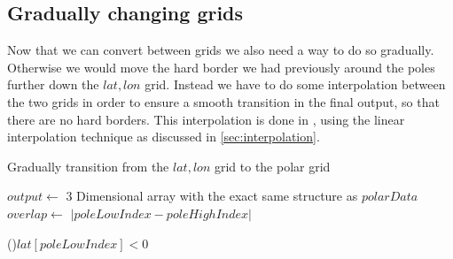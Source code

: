 \subsection{Gradually changing grids}
Now that we can convert between grids we also need a way to do so gradually. Otherwise we would move the hard border we had previously around the poles further down the $lat, lon$ grid. Instead 
we have to do some interpolation between the two grids in order to ensure a smooth transition in the final output, so that there are no hard borders. This interpolation is done in , using the 
linear interpolation technique as discussed in \autoref{sec:interpolation}.

\begin{algorithm}[htb]
    \caption{Gradually transition from the $lat, lon$ grid to the polar grid}
    \label{alg:polar interpolation}
    $output \leftarrow$ 3 Dimensional array with the exact same structure as $polarData$ \;
    $overlap \leftarrow $ $|poleLowIndex - poleHighIndex|$ \;
    
    \BlankLine
    \uIf(){$lat[poleLowIndex] < 0$}{
        \DontPrintSemicolon
        \PrintSemicolon
    } 

    \BlankLine
\end{algorithm}

